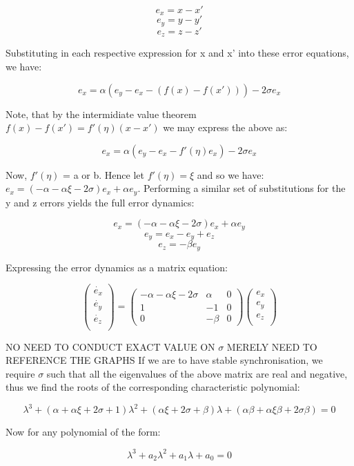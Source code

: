 \documentclass{article}
\begin{document}
$$e_{x} = x - x'$$
$$e_{y} = y - y'$$
$$e_{z} = z - z'$$

Substituting in each respective expression for x and x' into these error equations, we have:

$$e_{x} = \alpha(e_{y} - e_{x} - (f(x) - f(x'))) - 2\sigma e_{x}$$


Note, that by the intermidiate value theorem $f(x) - f(x') = f'(\eta)(x - x')$ we may express the above as:

$$e_{x} = \alpha(e_{y} - e_{x} - f'(\eta)e_{x}) - 2\sigma e_{x}$$

Now, $f'(\eta)$ = a or b. Hence let $f'(\eta) = \xi$ and so
we have: $e_{x} = (-\alpha - \alpha\xi - 2\sigma)e_{x} + \alpha e_{y}$. Performing a
similar set of substitutions for the y and z errors yields the full error dynamics:

$$e_{x} = (-\alpha - \alpha\xi - 2\sigma)e_{x} + \alpha e_{y}$$
$$e_{y} = e_{x} - e_{y} + e_{z}$$
$$e_{z} = -\beta e_{y}$$

Expressing the error dynamics as a matrix equation:


$$
\begin{pmatrix}
    \dot{e_{x}} \\
    \dot{e_{y}} \\
    \dot{e_{z}} \\
\end{pmatrix} =
\begin{pmatrix}
-\alpha - \alpha\xi - 2\sigma & \alpha & 0\\
1 & -1 & 0\\
0 & -\beta & 0
\end{pmatrix}
\begin{pmatrix}
    e_{x} \\
    e_{y} \\
    e_{z} \\
\end{pmatrix}
$$

NO NEED TO CONDUCT EXACT VALUE ON $\sigma$ MERELY NEED TO REFERENCE THE GRAPHS
If we are to have stable synchronisation, we require $\sigma$ such that all the eigenvalues of
the above matrix are real and negative, thus we find the roots of the corresponding characteristic
polynomial:

$$\lambda^3 + (\alpha + \alpha\xi + 2\sigma + 1)\lambda^2 + (\alpha\xi + 2\sigma + \beta)\lambda + (\alpha\beta + \alpha\xi\beta + 2\sigma\beta) = 0$$

Now for any polynomial of the form:

$$\lambda^3 + a_{2}\lambda^2 + a_{1}\lambda + a_{0} = 0$$
\end{document}
